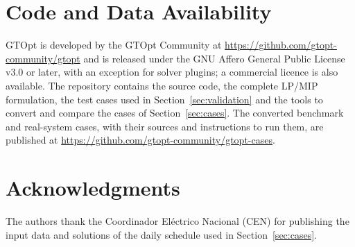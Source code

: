 \documentclass[journal]{IEEEtran}
\newif\ifjournalversion
\begin{document}










\section*{Code and Data Availability}
GTOpt is developed by the GTOpt Community at
\url{https://github.com/gtopt-community/gtopt} and is released under
the GNU Affero General Public License v3.0 or later, with an exception
for solver plugins; a commercial licence is also available.  The
repository contains the source code, the complete LP/MIP formulation,
the test cases used in Section~\ref{sec:validation} and the tools to
convert and compare the cases of Section~\ref{sec:cases}.  The converted
benchmark and real-system cases, with their sources and instructions to
run them, are published at
\url{https://github.com/gtopt-community/gtopt-cases}.

\section*{Acknowledgments}
The authors thank the Coordinador El\'ectrico Nacional (CEN) for
publishing the input data and solutions of the daily schedule used in
Section~\ref{sec:cases}.




\ifjournalversion
  
\fi
\end{document}
